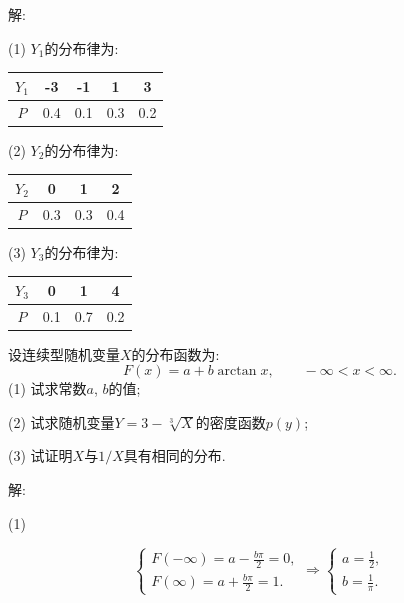 \documentclass[standard]{ExBook}
\begin{document}
\begin{qitems}
    \begin{bbox}
解: 

(1) $Y_1$的分布律为:
\begin{center}
\begin{tabular}{c|cccc}
$Y_1$ & -3 & -1 & 1 & 3\\
\hline
$P$ & 0.4 & 0.1 & 0.3 & 0.2\\
\end{tabular}
\end{center}

(2) $Y_2$的分布律为:
\begin{center}
\begin{tabular}{c|ccc}
$Y_2$ & 0 & 1 & 2\\
\hline
$P$ & 0.3 & 0.3 & 0.4\\
\end{tabular}
\end{center}

(3) $Y_3$的分布律为:
\begin{center}
\begin{tabular}{c|ccc}
$Y_3$ & 0 & 1 & 4\\
\hline
$P$ & 0.1 & 0.7 & 0.2\\
\end{tabular}
\end{center}
    \end{bbox}

\vspace{-5em}

    \begin{bbox}
    \begin{shaded}
        \qitem
设连续型随机变量$X$的分布函数为:
$$F(x)=a+b\arctan x,\qquad -\infty < x < \infty.$$
(1) 试求常数$a$, $b$的值;

(2) 试求随机变量$Y=3-\sqrt[3]{X}$的密度函数$p(y)$;

(3) 试证明$X$与$1/X$具有相同的分布.
    \end{shaded}
    \end{bbox}

\vspace{-5em}

    \begin{bbox}
解: 

(1)
\vspace{-2em}
\begin{center}
\begin{equation}
    \left\{
    \begin{array}{cl}
        \nonumber
        F(-\infty)=a-\displaystyle\frac{b\pi}{2}=0,\\
        F(\infty)=a+\displaystyle\frac{b\pi}{2}=1.
    \end{array}
    \right.
    \Longrightarrow
    \left\{
    \begin{array}{cl}
        \nonumber
        a=\displaystyle\frac{1}{2},\\
        b=\displaystyle\frac{1}{\pi}.
    \end{array}
    \right.
\end{equation}
\end{center}


\end{bbox}
\end{qitems}
\end{document}
